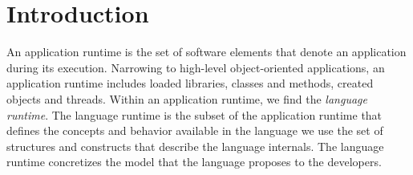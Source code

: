 
\chapter{Introduction}
\minitoc


%
%


An application runtime is the set of software elements that denote an application during its execution. Narrowing to high-level object-oriented applications, an application runtime includes \eg loaded libraries, classes and methods, created objects and threads. Within an application runtime, we find the \emph{language runtime}. The language runtime is the subset of the application runtime that defines the concepts and behavior available in the language we use \ie the set of structures and constructs that describe the language internals. The language runtime concretizes the model that the language proposes to the developers.

